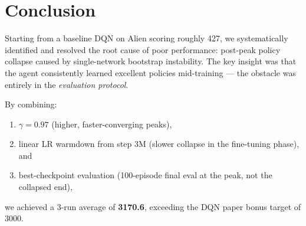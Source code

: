 \documentclass[11pt,a4paper]{article}
\begin{document}
\section{Conclusion}

Starting from a baseline DQN on Alien scoring roughly 427, we systematically identified and
resolved the root cause of poor performance: post-peak policy collapse caused by single-network
bootstrap instability. The key insight was that the agent consistently learned excellent
policies mid-training — the obstacle was entirely in the \emph{evaluation protocol}.

By combining:
\begin{enumerate}
  \item $\gamma = 0.97$ (higher, faster-converging peaks),
  \item linear LR warmdown from step 3M (slower collapse in the fine-tuning phase), and
  \item best-checkpoint evaluation (100-episode final eval at the peak, not the collapsed end),
\end{enumerate}
we achieved a 3-run average of \textbf{3170.6}, exceeding the DQN paper bonus target of 3000.
\end{document}

